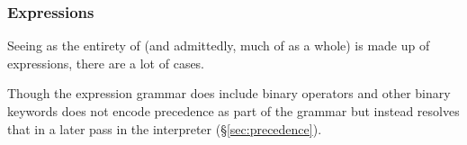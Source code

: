 \subsubsection{Expressions}
\label{sec:expressions}

Seeing as the entirety of \Poetry{} (and admittedly, much of \Trilogy{} as a whole)
is made up of expressions, there are a lot of cases.

Though the expression grammar does include binary operators and other binary keywords
\Trilogy{} does not encode precedence as part of the grammar but instead resolves that
in a later pass in the interpreter (\S\ref{sec:precedence}).

\begin{bnf*}
     \\
     \\
     \\
     \\
     \\
     \\
\end{bnf*}

